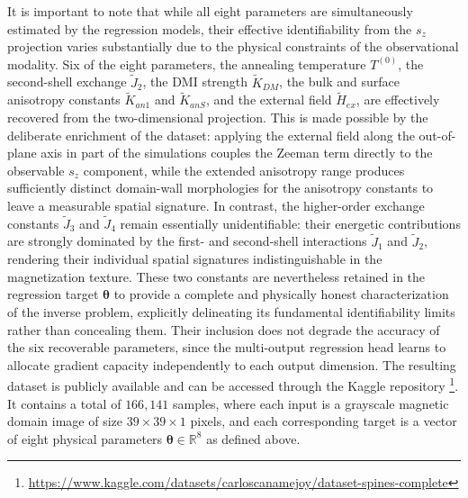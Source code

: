 \documentclass[final,5p,times,twocolumn]{elsarticle}
\begin{document}
It is important to note that while all eight parameters
are simultaneously estimated by the regression models,
their effective identifiability from the $s_z$
projection varies substantially due to the physical
constraints of the observational modality. Six of the
eight parameters, the annealing temperature $T^{(0)}$,
the second-shell exchange $\tilde{J}_2$, the DMI strength
$\tilde{K}_{DM}$, the bulk and surface anisotropy
constants $\tilde{K}_{an1}$ and $\tilde{K}_{anS}$, and the
external field $\tilde{H}_{ex}$, are effectively
recovered from the two-dimensional projection. This is
made possible by the deliberate enrichment of the dataset:
applying the external field along the out-of-plane axis in
part of the simulations couples the Zeeman term directly
to the observable $s_z$ component, while the extended
anisotropy range produces sufficiently distinct domain-wall
morphologies for the anisotropy constants to leave a
measurable spatial signature. In contrast, the
higher-order exchange constants $\tilde{J}_3$ and
$\tilde{J}_4$ remain essentially unidentifiable: their
energetic contributions are strongly dominated by the
first- and second-shell interactions $\tilde{J}_1$ and
$\tilde{J}_2$, rendering their individual spatial
signatures indistinguishable in the magnetization texture.
These two constants are nevertheless retained in the
regression target $\boldsymbol{\theta}$ to provide a
complete and physically honest characterization of the
inverse problem, explicitly delineating its fundamental
identifiability limits rather than concealing them. Their
inclusion does not degrade the accuracy of the six
recoverable parameters, since the multi-output regression
head learns to allocate gradient capacity independently
to each output dimension. The resulting dataset is
publicly available and can be accessed through the
Kaggle repository%
\footnote{\url{https://www.kaggle.com/datasets/carloscanamejoy/dataset-spines-complete}}. 
It contains a total of $166{,}141$ samples, where 
each input is a grayscale magnetic domain image of 
size $39 \times 39 \times 1$ pixels, and each 
corresponding target is a vector of eight physical
parameters $\boldsymbol{\theta} \in \mathbb{R}^8$
as defined above.
\end{document}

